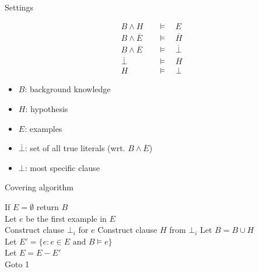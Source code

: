 \begin{frame}{Settings}

\vfill

\begin{align}
B \land H \quad &\models \quad E \\
B \land \overline{E} \quad &\models \quad \overline{H} \\
B \land \overline{E} \quad &\models \quad \overline{\bot} \\
\overline{\bot} \quad &\models \quad \overline{H} \\
H \quad &\models \quad \bot
\end{align}

\vfill

\begin{multicols}{2}
\begin{itemize}
\item $B$: background knowledge
\item $H$: hypothesis
\item $E$: examples
\item $\overline{\bot}$: set of all true literals (wrt. $B \land \overline{E}$)
\item $\bot$: most specific clause
\end{itemize}
\end{multicols}

\vfill

\end{frame}


\begin{frame}{Covering algorithm}
    
\begin{algorithm}[H]
\scriptsize
\caption{Cover set algorithm}
If $E = \emptyset$ return $B$ \\
Let $e$ be the first example in $E$ \\
Construct clause $\bot_i$ for $e$ 
Construct clause $H$ from $\bot_i$ 
Let $B = B \cup H$ \\
Let $E' = \{e: e \in E \text{ and } B \models e\}$ \\
Let $E = E-E'$ \\
Goto 1
\end{algorithm}

\end{frame}
% 

